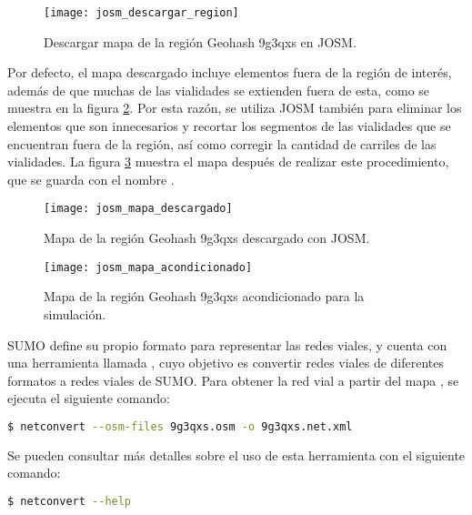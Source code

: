 \begin{figure}[th!]
\centering
\texttt{[image: josm\_descargar\_region]}
\decoRule
\caption[Descargar mapa de la región Geohash 9g3qxs en JOSM]{Descargar mapa de
la región Geohash 9g3qxs en JOSM.}
\label{fig:josm_descargar_region}
\end{figure}

Por defecto, el mapa descargado incluye elementos fuera de la región de
interés, además de que muchas de las vialidades se extienden fuera de esta,
como se muestra en la figura \ref{fig:josm_mapa_descargado}. Por esta razón, se
utiliza JOSM también para eliminar los elementos que son innecesarios y
recortar los segmentos de las vialidades que se encuentran fuera de la región,
así como corregir la cantidad de carriles de las vialidades. La figura
\ref{fig:josm_mapa_acondicionado} muestra el mapa después de realizar este
procedimiento, que se guarda con el nombre .

\begin{figure}[th!]
\centering
\texttt{[image: josm\_mapa\_descargado]} 
\decoRule
\caption[Mapa de la región Geohash 9g3qxs descargado con JOSM]{Mapa de la
región Geohash 9g3qxs descargado con JOSM.}
\label{fig:josm_mapa_descargado}
\end{figure}

\begin{figure}[th!]
\centering
\texttt{[image: josm\_mapa\_acondicionado]}
\decoRule
\caption[Mapa de la región Geohash 9g3qxs acondicionado para la
simulación]{Mapa de la región Geohash 9g3qxs acondicionado para la simulación.}
\label{fig:josm_mapa_acondicionado}
\end{figure}

SUMO define su propio formato para representar las redes viales, y cuenta con
una herramienta llamada , cuyo objetivo es convertir redes
viales de diferentes formatos a redes viales de SUMO. Para obtener la red vial
 a partir del mapa , se ejecuta el
siguiente comando:

\begin{lstlisting}[language=bash]
$ netconvert --osm-files 9g3qxs.osm -o 9g3qxs.net.xml
\end{lstlisting}

Se pueden consultar más detalles sobre el uso de esta herramienta con el
siguiente comando:

\begin{lstlisting}[language=bash]
$ netconvert --help
\end{lstlisting}

